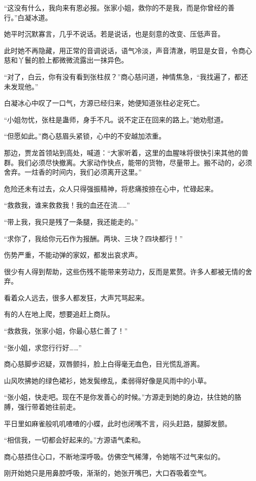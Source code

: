 \begin{this_body}
“这没有什么，我向来有恩必报。张家小姐，救你的不是我，而是你曾经的善行。”白凝冰道。

她平时沉默寡言，几乎不说话。若是说话，也是刻意的改变、压低声音。

此时她不再隐藏，用正常的音调说话，语气冷淡，声音清澈，明显是女音，令商心慈和丫鬟的脸上都微微流露出一抹异色。

“对了，白云，你有没有看到张柱叔？”商心慈问道，神情焦急，“我找遍了，都还未发现他。”

白凝冰心中叹了一口气，方源已经归来，她便知道张柱必定死亡。

“小姐勿忧，张柱是蛊师，身手不凡。说不定正在回来的路上。”她劝慰道。

“但愿如此。”商心慈眉头紧锁，心中的不安越加浓重。

那边，贾龙首领站到高处，喊道：“大家听着，这里的血腥味将很快引来其他的兽群。我们必须尽快撤离。大家动作快点，能带的货物，尽量带上。搬不动的，必须舍弃。一炷香的时间内，我们必须离开这里。”

危险还未有过去，众人只得强振精神，将悲痛按捺在心中，忙碌起来。

“救救我，谁来救救我！我的血还在流……”

“带上我，我只是残了一条腿，我还能走的。”

“求你了，我给你元石作为报酬。两块、三块？四块都行！”

伤势严重，不能动弹的家奴，都发出哀求声。

很少有人得到帮助，这些伤残不能带来劳动力，反而是累赘。许多人都被无情的舍弃。

看着众人远去，很多人都发狂，大声咒骂起来。

有的人在地上爬，想要追赶上商队。

“救救我，张家小姐，你最心慈仁善了！”

“张小姐，求您行行好……”

商心慈脚步迟疑，双唇颤抖，脸上白得毫无血色，目光慌乱游离。

山风吹拂她的绿色裙衫，她发鬓缭乱，柔弱得好像是风雨中的小草。

“张小姐，快走吧。现在不是你发善心的时候。”方源走到她的身边，扶住她的胳膊，强行带着她往前走。

平日里如麻雀般叽叽喳喳的小蝶，此时也闭嘴不言，闷头赶路，腿脚发颤。

“相信我，一切都会好起来的。”方源语气柔和。

商心慈捂住心口，不断地深呼吸。仿佛空气稀薄，令她喘不过气来似的。

刚开始她只是用鼻腔呼吸，渐渐的，她张开嘴巴，大口吞吸着空气。


\end{this_body}
